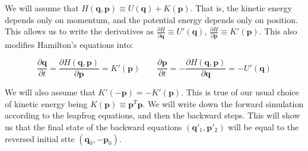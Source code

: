 \documentclass[titlepage]{article}
\newcommand{\p}{\mathbf{p}}
\newcommand{\q}{\mathbf{q}}
\begin{document}
We will assume that $H(\q, \p) \equiv U(\q) + K(\p)$. That is, the kinetic
energy depends only on momentum, and the potential energy depends only
on position. This allows us to write the derivatives as
$\frac{\partial H}{\partial \q} \equiv U'(\q)$,
$\frac{\partial H}{\partial \p} \equiv K'(\p)$. This also modifies Hamilton's
equations into:

$$
\frac{\partial \q}{\partial t} = \frac{\partial H(\q, \p)}{\partial \p} = K'(\p) \qquad
\frac{\partial \p}{\partial t} = -\frac{\partial H(\q, \p)}{\partial \q} = -U'(\q)
$$

We will also assume that $K'(-\p) = -K'(\p)$. This is true of our usual
choice of kinetic energy being $K(\p) \equiv \p^T \p$. We will
write down the forward simulation according to the leapfrog equations,
and then the backward steps. This will show us that the final
state of the backward equations $(\q'_1, \p'_2)$ will be equal
to the reversed initial stte $(\q_0, -\p_0)$.
\end{document}
